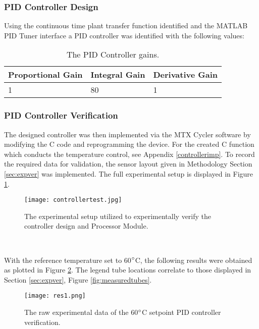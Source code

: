 \subsubsection{PID Controller Design}

Using the continuous time plant transfer function identified and the MATLAB PID Tuner interface a PID controller was identified with the following values:

\begin{table}[h!]
	\begin{center}
		\begin{tabular}{ | p{4cm} |  p{4cm} | p{4cm} | }
			\hline
			Proportional Gain & Integral Gain & Derivative Gain \\ \hline
			1 & 80 & 1 \\ \hline
		\end{tabular}
	\end{center}
	\caption[PID Controller Gains.]{The PID Controller gains.}
	\label{tab:PIDgains}
\end{table}

\subsubsection{PID Controller Verification}
\label{sec:controller_verification}

The designed controller was then implemented via the MTX Cycler software by modifying the C code and reprogramming the device. For the created C function which conducts the temperature control, see Appendix \ref{controllerimp}. To record the required data for validation, the sensor layout given in Methodology Section \ref{sec:expver} was implemented. The full experimental setup is displayed in Figure \ref{fig:controllertest]}.

\begin{figure}[!htb]
	\centering
	\texttt{[image: controllertest.jpg]}
	\caption[Controller Verification Experimental Setup.]{The experimental setup utilized to experimentally verify the controller design and Processor Module.}
	\label{fig:controllertest]}
\end{figure} 
\FloatBarrier

 With the reference temperature set to 60$\degree$C, the following results were obtained as plotted in Figure \ref{fig:res1}. The legend tube locations correlate to those displayed in Section \ref{sec:expver}, Figure \ref{fig:measuredtubes}. 
 
\begin{figure}[!htb]
	\centering
	\texttt{[image: res1.png]}
	\caption[Temperature Sensor Data - 60$\degree$C Setpoint.]{The raw experimental data of the 60$\degree$C setpoint PID controller verification.}
	\label{fig:res1}
\end{figure} 
\FloatBarrier

